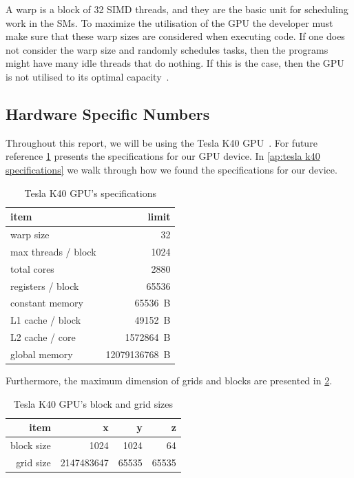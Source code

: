 A warp is a block of 32 SIMD threads, and they are the basic unit for scheduling work in the SMs.
To maximize the utilisation of the GPU the developer must make sure that these warp sizes are considered when executing code.
If one does not consider the warp size and randomly schedules tasks, then the programs might have many idle threads that do nothing.
If this is the case, then the GPU is not utilised to its optimal capacity~\cite{fermi2009nvidia}.

\subsection{Hardware Specific Numbers}
\label{sec:hardware specific numbers}

Throughout this report, we will be using the Tesla K40 GPU~\cite{teslak402013nvidia}.
For future reference \cref{tab:tesla k40 specs} presents the specifications for our GPU device.
In \cref{ap:tesla k40 specifications} we walk through how we found the specifications for our device.

\begin{table}[htb]
  \centering
  \begin{tabular}{l r}
    \toprule
    item                        & limit \\
    \midrule
    warp size                   & \SI{32}{} \\
    max threads / block         & \SI{1024}{} \\
    total cores                 & \SI{2880}{} \\
    registers / block           & \SI{65536}{} \\
    constant memory             & \SI{65536}{B} \\
    L1 cache / block            & \SI{49152}{B}  \\
    L2 cache / core             & \SI{1572864}{B}  \\
    global memory               & \SI{12079136768}{B} \\
    \bottomrule
  \end{tabular}
  \caption{Tesla K40 GPU's specifications}
  \label{tab:tesla k40 specs}
\end{table}

Furthermore, the maximum dimension of grids and blocks are presented in \cref{tab:tesla k40 grid and block}.

\begin{table}[htb]
  \centering
  \begin{tabular}{r r r r}
    \toprule
    item & x & y & z \\
    \midrule
    block size & \SI{1024}{} & \SI{1024}{} & \SI{64}{} \\
    grid size  & \SI{2147483647}{} & \SI{65535}{} & \SI{65535}{} \\
    \bottomrule
  \end{tabular}
  \caption{Tesla K40 GPU's block and grid sizes}
  \label{tab:tesla k40 grid and block}
\end{table}
